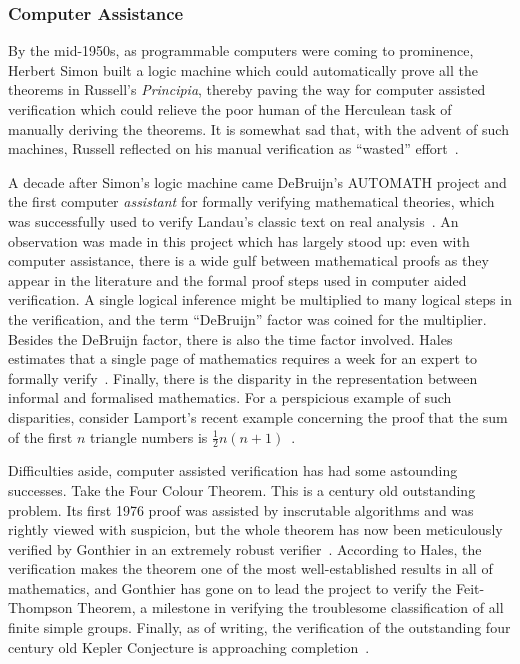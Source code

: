 \subsubsection{Computer Assistance}
By the mid-1950s, as programmable computers were coming to prominence, Herbert Simon built a logic machine which could automatically prove all the theorems in Russell's \emph{Principia}, thereby paving the way for computer assisted verification which could relieve the poor human of the Herculean task of manually deriving the theorems. It is somewhat sad that, with the advent of such machines, Russell reflected on his manual verification as ``wasted'' effort~\cite{SimonObituary}.

A decade after Simon's logic machine came DeBruijn's AUTOMATH project and the first computer \emph{assistant} for formally verifying mathematical theories, which was successfully used to verify Landau's classic text on real analysis~\cite{LandauGrundlagen,LandauAUTOMATH}. An observation was made in this project which has largely stood up: even with computer assistance, there is a wide gulf between mathematical proofs as they appear in the literature and the formal proof steps used in computer aided verification. A single logical inference might be multiplied to many logical steps in the verification, and the term ``DeBruijn'' factor was coined for the multiplier. Besides the DeBruijn factor, there is also the time factor involved. Hales estimates that a single page of mathematics requires a week for an expert to formally verify~\cite{HalesFormalisingCost}. Finally, there is the disparity in the representation between informal and formalised mathematics. For a perspicious example of such disparities, consider Lamport's recent example concerning the proof that the sum of the first $n$ triangle numbers is $\tfrac{1}{2}n(n+1)$~\cite{ProofMessageCertificate}.

Difficulties aside, computer assisted verification has had some astounding successes. Take the Four Colour Theorem. This is a century old outstanding problem. Its first 1976 proof was assisted by inscrutable algorithms and was rightly viewed with suspicion, but the whole theorem has now been meticulously verified by Gonthier in an extremely robust verifier~\cite{GonthierFCT}. According to Hales, the verification makes the theorem one of the most well-established results in all of mathematics, and Gonthier has gone on to lead the project to verify the Feit-Thompson Theorem, a milestone in verifying the troublesome classification of all finite simple groups. Finally, as of writing, the verification of the outstanding four century old Kepler Conjecture is approaching completion~\cite{flyspeck}.


